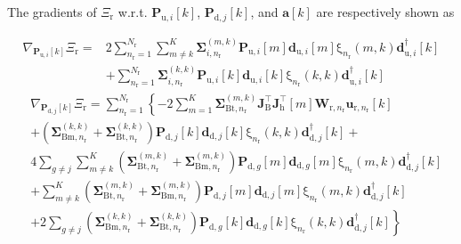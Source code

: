 \documentclass[10pt,journal]{IEEEtran}
\newcommand{\paren}[1]{\left({#1}\right)}
\newcommand{\bracket}[1]{{\left [{#1}\right ]}}
\newcommand{\rr}{_\mathrm{r}}
\newcommand{\rnr}{_{\mathrm{r},n_\mathrm{r}}}
\newcommand{\PiB}{\mathbf{P}_{\textrm{u},i}\bracket{k}}
\newcommand{\PBj}{\mathbf{P}_{\textrm{d},j}\bracket{k}}
\newcommand{\Wrnr}{\mathbf{W}_{\mathrm{r},n_\mathrm{r}}}
\newcommand{\urk}{\mathbf{u}_{\mathrm{r},n_\mathrm{r}}\bracket{k}}
\theoremstyle{definition}
\begin{document}
		The gradients of $\Xi_{\text{r}}$ w.r.t. $\PiB$, $\PBj$, and $\mathbf{a}\bracket{k}$ are respectively shown as \par\noindent\small
		\begin{align}
			\nabla_{\PiB}\Xi_{\mathrm{r}}=&2\sum_{n\rr=1}^{\mathit{N}\rr}\sum_{m\neq k}^{\mathrm{\mathit{K}}}\boldsymbol{\Sigma}^{\paren{m,k}}_{i,n\rr}\mathbf{P}_{\textrm{u},i}\bracket{m}\mathbf{d}_{\mathrm{u},i}\bracket{m}\mathrm{\xi}_{n\rr}\paren{m,k}\mathbf{d}^\dagger_{\textrm{u},i}\bracket{k}\nonumber\\
			&+\sum_{n\rr=1}^{\mathit{N}\rr}\boldsymbol{\Sigma}^{\paren{k,k}}_{i,n\rr}\mathbf{P}_{\textrm{u},i}\bracket{k}\mathbf{d}_{\mathrm{u},i}\bracket{k}\mathrm{\xi}_{n\rr}\paren{k,k}\mathbf{d}^\dagger_{\textrm{u},i}\bracket{k}\nonumber
		\end{align}
		\begin{align}
			&\nabla_{\PBj}\Xi_{\textrm{r}}=\sum_{n\rr=1}^{\mathit{N}\rr}\left\lbrace -2\sum_{m=1}^{K}\boldsymbol{\Sigma}^{\paren{m,k}}_{\mathrm{Bt},n\rr}\mathbf{J}^\top_{\mathrm{B}}\mathbf{J}^\top_{\mathrm{h}}\bracket{m}\Wrnr\urk\right.\nonumber\\
			&+\paren{\boldsymbol{\Sigma}^{\paren{k,k}}_{\mathrm{Bm},n\rr}+\boldsymbol{\Sigma}^{\paren{k,k}}_{\mathrm{Bt},n\rr}}\mathbf{P}_{\textrm{d},j}\bracket{k}\mathbf{d}_{\mathrm{d},j}\bracket{k}\mathrm{\xi}_{n\rr}\paren{k,k}\mathbf{d}^\dagger_{\textrm{d},j}\bracket{k}+\nonumber\\
			&4\sum_{g\neq j}\sum_{m\neq k}^{\mathrm{\mathit{K}}}\paren{\boldsymbol{\Sigma}^{\paren{m,k}}_{\mathrm{Bt},n\rr}+\boldsymbol{\Sigma}^{\paren{m,k}}_{\mathrm{Bm},n\rr}}\mathbf{P}_{\textrm{d},g}\bracket{m}\mathbf{d}_{\mathrm{d},g}\bracket{m}\mathrm{\xi}_{n\rr}\paren{m,k}\mathbf{d}^\dagger_{\textrm{d},j}\bracket{k}\nonumber\\
			&+\sum_{m\neq k}^{\mathrm{\mathit{K}}}\paren{\boldsymbol{\Sigma}^{\paren{m,k}}_{\mathrm{Bt},n\rr}+\boldsymbol{\Sigma}^{\paren{m,k}}_{\mathrm{Bm},n\rr}}\mathbf{P}_{\textrm{d},j}\bracket{m}\mathbf{d}_{\mathrm{d},j}\bracket{m}\mathrm{\xi}_{n\rr}\paren{m,k}\mathbf{d}^\dagger_{\textrm{d},j}\bracket{k}\nonumber\\
			&\left.+2\sum_{g\neq j}\paren{\boldsymbol{\Sigma}^{\paren{k,k}}_{\mathrm{Bm},n\rr}+\boldsymbol{\Sigma}^{\paren{k,k}}_{\mathrm{Bt},n\rr}}\mathbf{P}_{\textrm{d},g}\bracket{k}\mathbf{d}_{\mathrm{d},g}\bracket{k}\mathrm{\xi}_{n\rr}\paren{k,k}\mathbf{d}^\dagger_{\textrm{d},j}\bracket{k}\right\rbrace\nonumber
		\end{align}
\end{document}
